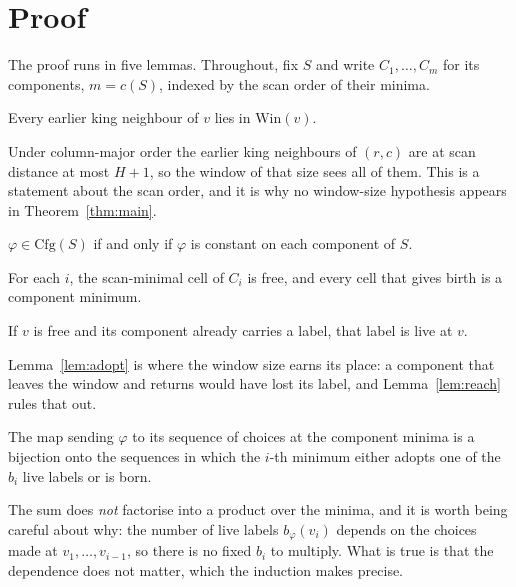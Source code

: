 \documentclass[11pt]{article}
\newcommand{\Win}{\mathrm{Win}}
\newcommand{\Cfg}{\mathrm{Cfg}}
\begin{document}
\section{Proof}
\label{sec:proof}

The proof runs in five lemmas. Throughout, fix $S$ and write $C_1, \dots, C_m$ for
its components, $m = c(S)$, indexed by the scan order of their minima.

\begin{lemma}[reach]
\label{lem:reach}
Every earlier king neighbour of $v$ lies in $\Win(v)$.
\end{lemma}

Under column-major order the earlier king neighbours of $(r,c)$ are at scan
distance at most $H+1$, so the window of that size sees all of them. This is a
statement about the scan order, and it is why no window-size hypothesis appears
in Theorem~\ref{thm:main}.

\begin{lemma}
\label{lem:const}
$\varphi \in \Cfg(S)$ if and only if $\varphi$ is constant on each component of
$S$.
\end{lemma}

\begin{lemma}
\label{lem:minima}
For each $i$, the scan-minimal cell of $C_i$ is free, and every cell that gives
birth is a component minimum.
\end{lemma}

\begin{lemma}
\label{lem:adopt}
If $v$ is free and its component already carries a label, that label is live at
$v$.
\end{lemma}

Lemma~\ref{lem:adopt} is where the window size earns its place: a component that
leaves the window and returns would have lost its label, and
Lemma~\ref{lem:reach} rules that out.

\begin{lemma}
\label{lem:choice}
The map sending $\varphi$ to its sequence of choices at the component minima is a
bijection onto the sequences in which the $i$-th minimum either adopts one of the
$b_i$ live labels or is born.
\end{lemma}

The sum does \emph{not} factorise into a product over the minima, and it is
worth being careful about why: the number of live labels $b_\varphi(v_i)$ depends
on the choices made at $v_1, \dots, v_{i-1}$, so there is no fixed $b_i$ to
multiply. What is true is that the dependence does not matter, which the
induction makes precise.
\end{document}
